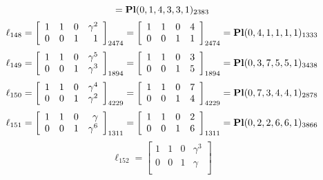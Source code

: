 \documentclass{article}
\begin{document}
{$$={\rm\bf Pl}(0,1,4,3,3,1 )_{2383}$$
$$
\ell_{148} = 
\left[
\begin{array}{*{4}{r}}
1 & 1 & 0 & \gamma^{2}\\
0 & 0 & 1 & 1\\
\end{array}
\right]
_{2474}
=
\left[
\begin{array}{*{4}c}
1  & 1  & 0  & 4\\
0  & 0  & 1  & 1\\
\end{array}
\right]_{2474}
={\rm\bf Pl}(0,4,1,1,1,1 )_{1333}$$
$$
\ell_{149} = 
\left[
\begin{array}{*{4}{r}}
1 & 1 & 0 & \gamma^{5}\\
0 & 0 & 1 & \gamma^{3}\\
\end{array}
\right]
_{1894}
=
\left[
\begin{array}{*{4}c}
1  & 1  & 0  & 3\\
0  & 0  & 1  & 5\\
\end{array}
\right]_{1894}
={\rm\bf Pl}(0,3,7,5,5,1 )_{3438}$$
$$
\ell_{150} = 
\left[
\begin{array}{*{4}{r}}
1 & 1 & 0 & \gamma^{4}\\
0 & 0 & 1 & \gamma^{2}\\
\end{array}
\right]
_{4229}
=
\left[
\begin{array}{*{4}c}
1  & 1  & 0  & 7\\
0  & 0  & 1  & 4\\
\end{array}
\right]_{4229}
={\rm\bf Pl}(0,7,3,4,4,1 )_{2878}$$
$$
\ell_{151} = 
\left[
\begin{array}{*{4}{r}}
1 & 1 & 0 & \gamma \\
0 & 0 & 1 & \gamma^{6}\\
\end{array}
\right]
_{1311}
=
\left[
\begin{array}{*{4}c}
1  & 1  & 0  & 2\\
0  & 0  & 1  & 6\\
\end{array}
\right]_{1311}
={\rm\bf Pl}(0,2,2,6,6,1 )_{3866}$$
$$
\ell_{152} = 
\left[
\begin{array}{*{4}{r}}
1 & 1 & 0 & \gamma^{3}\\
0 & 0 & 1 & \gamma \\
\end{array}
\right]
$$}
\end{document}
